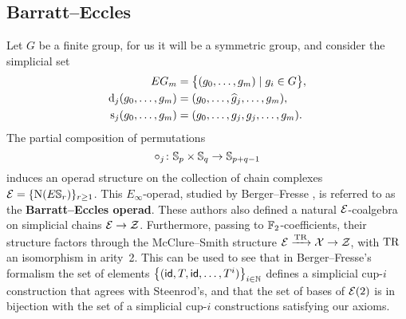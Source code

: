 \subsection{Barratt--Eccles}

Let $G$ be a finite group, for us it will be a symmetric group, and consider the simplicial set
\[
\begin{split}
	EG_m &= \big\{ (g_0, \dots, g_m) \mid g_i \in G \big\}, \\
	\operatorname{d}_j(g_0, \dots, g_m) &= (g_0, \dots, \widehat g_j, \dots, g_m), \\
	\operatorname{s}_j(g_0, \dots, g_m) &= (g_0, \dots, g_j, g_j, \dots, g_m).
\end{split}
\]
The partial composition of permutations
\[
\circ_j \colon \mathbb{S}_p \times \mathbb{S}_q \to \mathbb{S}_{p+q-1}
\]
induces an operad structure on the collection of chain complexes $\mathcal{E} = \{\operatorname{N}(E \mathbb{S}_r)\}_{r\geq1}$.
This $E_\infty$-operad, studied by Berger--Fresse \cite{berger2004combinatorial}, is referred to as the \textbf{Barratt--Eccles operad}.
These authors also defined a natural $\mathcal{E}$-coalgebra on simplicial chains $\mathcal{E} \to \mathcal{Z}$.
Furthermore, passing to ${\mathbb{F}_2}$-coefficients, their structure factors through the McClure--Smith structure $\mathcal{E} \xrightarrow{\operatorname{TR}} \mathcal{X} \to \mathcal{Z}$, with $\operatorname{TR}$ an isomorphism in arity~2.
This can be used to see that in Berger--Fresse's formalism the set of elements $\big\{ (\mathsf{id}, T, \mathsf{id}, \dots, T^i) \big\}_{i \in \mathbb{N}}$ defines a simplicial \mbox{cup-$i$} construction that agrees with Steenrod's, and that the set of bases of $\mathcal{E}(2)$ is in bijection with the set of a simplicial \mbox{cup-$i$} constructions satisfying our axioms.